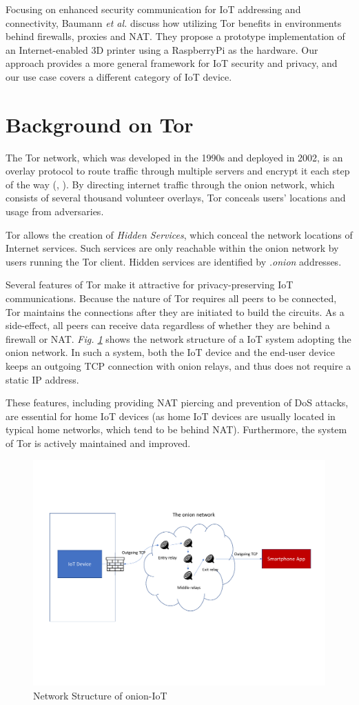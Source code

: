 Focusing on enhanced security communication for IoT addressing and connectivity, Baumann \textit{et al.} \cite{baumann2018utilising} discuss how utilizing Tor benefits in environments behind firewalls, proxies and NAT. They propose a prototype implementation of an Internet-enabled 3D printer using a RaspberryPi as the hardware. Our approach provides a more general framework for IoT security and privacy, and our use case covers a different category of IoT device.

\section{Background on Tor}
\label{sec:torbackground}
The Tor network, which was developed in the 1990s and deployed in 2002, is an overlay protocol to route traffic through multiple servers and encrypt it each step of the way (\cite{torproject}, \cite{chaabane2010digging}). By directing internet traffic through the onion network, which consists of several thousand volunteer overlays, Tor conceals users' locations and usage from adversaries.

Tor allows the creation of \textit{Hidden Services}, which conceal the network locations of Internet services. Such services are only reachable within the onion network by users running the Tor client. Hidden services are identified by \textit{.onion} addresses.

Several features of Tor make it attractive for privacy-preserving IoT communications. Because the nature of Tor requires all peers to be connected, Tor maintains the connections after they are initiated to build the circuits. As a side-effect, all peers can receive data regardless of whether they are behind a firewall or NAT. \textit{Fig. \ref{fig:natpiercing}} shows the network structure of a IoT system adopting the onion network. In such a system, both the IoT device and the end-user device keeps an outgoing TCP connection with onion relays, and thus does not require a static IP address.

These features, including providing NAT piercing and prevention of DoS attacks, are essential for home IoT devices (as home IoT devices are usually located in typical home networks, which tend to be behind NAT). Furthermore, the system of Tor is actively maintained and improved.

\begin{figure}
	\includegraphics[width=\linewidth]{natpiercing.pdf}
	\caption{Network Structure of onion-IoT}
	\label{fig:natpiercing}
\end{figure}
